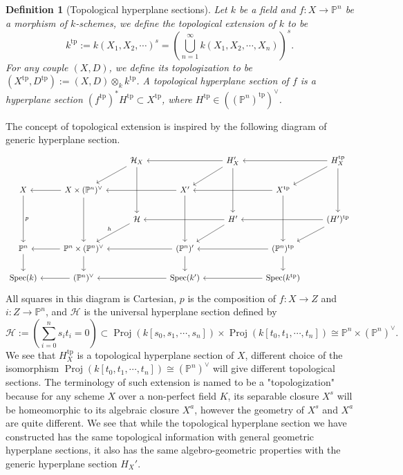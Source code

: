 \documentclass[letterpaper,reqno,12pt]{amsart}
\DeclareMathOperator{\Proj}{Proj}
\DeclareMathOperator{\Spec}{Spec}
\newcommand{\tp}{\mathrm{tp}}
\numberwithin{equation}{section}
\theoremstyle{plain}
\newtheorem{definition}{Definition}[section]
\begin{document}
\begin{definition}[Topological hyperplane sections]
    Let $k$ be a field and $f:X\to \mathbb P^n$ be a morphism of $k$-schemes, we define the topological extension of $k$ to be  
    \[k^\tp:=k(X_1,X_2,\cdots)^s=(\bigcup\limits_{n=1}^{\infty}k(X_1, X_2,\cdots,X_n))^s.\]
    For any couple $(X,D)$, we define its topologization to be $(X^\tp,D^\tp):=(X,D)\otimes_k k^\tp$. A topological hyperplane section of $f$ is a hyperplane section $(f^\tp)^*H^\tp\subset X^\tp$, where  $H^{\tp}\in ((\mathbb P^n)^\tp)^\vee$.
\end{definition}
The concept of topological extension is inspired by the following diagram of generic hyperplane section.
\[\begin{tikzcd}
	&& {\mathcal H_X} && {H'_X} && {H_X^\tp} \\
	X & {X\times(\mathbb P^n)^\vee} && {X'} && {X^\tp} \\
	&& {\mathcal H} && {H'} && {(H')^\tp} \\
	{\mathbb P^n} & {\mathbb P^n\times(\mathbb P^n)^\vee} && {(\mathbb P^n)'} && {(\mathbb P^n)^\tp} \\
	{\Spec (k)} & {(\mathbb P^n)^\vee} && {\Spec (k')} && {\Spec(k^\tp)}
	\arrow[from=1-3, to=2-2]
	\arrow[from=1-3, to=3-3]
	\arrow[from=1-5, to=1-3]
	\arrow[from=1-5, to=2-4]
	\arrow[from=1-5, to=3-5]
	\arrow[from=1-7, to=1-5]
	\arrow[from=1-7, to=2-6]
	\arrow[from=1-7, to=3-7]
	\arrow["p", from=2-1, to=4-1]
	\arrow[from=2-2, to=2-1]
	\arrow[from=2-2, to=4-2]
	\arrow[from=2-4, to=2-2]
	\arrow[from=2-4, to=4-4]
	\arrow[from=2-6, to=2-4]
	\arrow[from=2-6, to=4-6]
	\arrow["h"', from=3-3, to=4-2]
	\arrow[from=3-5, to=3-3]
	\arrow[from=3-5, to=4-4]
	\arrow[from=3-7, to=3-5]
	\arrow[from=3-7, to=4-6]
	\arrow[from=4-1, to=5-1]
	\arrow[from=4-2, to=4-1]
	\arrow[from=4-2, to=5-2]
	\arrow[from=4-4, to=4-2]
	\arrow[from=4-4, to=5-4]
	\arrow[from=4-6, to=4-4]
	\arrow[from=4-6, to=5-6]
	\arrow[from=5-2, to=5-1]
	\arrow[from=5-4, to=5-2]
	\arrow[from=5-6, to=5-4]
\end{tikzcd}\]
All squares in this diagram is Cartesian, $p$ is the composition of $f:X\to Z$ and $i:Z\to \mathbb P^n$, and $\mathcal H$ is the universal hyperplane section defined by 
\[\mathcal H:=(\sum\limits_{i=0}^ns_it_i=0)\subset \Proj(k[s_0,s_1,\cdots,s_n])\times\Proj (k[t_0,t_1,\cdots,t_n])\cong \mathbb P^n\times(\mathbb P^n)^\vee.\]
We see that $H_X^\tp$ is a topological hyperplane section of $X$, different choice of the isomorphism $\Proj (k[t_0,t_1,\cdots,t_n])\cong(\mathbb P^n)^\vee$ will give different topological sections. The terminology of such extension is named to be a "topologization" because for any scheme $X$ over a non-perfect field $K$, its separable closure $X^s$ will be homeomorphic to its algebraic closure $X^a$, however the geometry of $X^s$ and $X^a$ are quite different. We see that while the topological hyperplane section we have constructed has the same topological information with general geometric hyperplane sections, it also has the same algebro-geometric properties with the generic hyperplane section $H_X'$.
\end{document}
